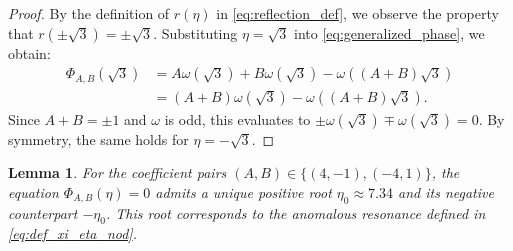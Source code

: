 \documentclass[reqno,english,11pt]{amsart}
\newtheorem{lemma}[theorem]{Lemma}
\theoremstyle{definition}
\numberwithin{equation}{section}
\begin{document}
\begin{proof}
    By the definition of $r(\eta)$ in \eqref{eq:reflection_def}, we observe the property that $r(\pm \sqrt{3}) = \pm \sqrt{3}$. Substituting $\eta = \sqrt{3}$ into \eqref{eq:generalized_phase}, we obtain:
    \begin{align*}
        \Phi_{A,B}(\sqrt{3}) &= A\omega(\sqrt{3}) + B\omega(\sqrt{3}) - \omega((A+B)\sqrt{3}) \\
        &= (A+B)\omega(\sqrt{3}) - \omega((A+B)\sqrt{3}).
    \end{align*}
    Since $A+B = \pm 1$ and $\omega$ is odd, this evaluates to $\pm \omega(\sqrt{3}) \mp \omega(\sqrt{3}) = 0$. By symmetry, the same holds for $\eta = -\sqrt{3}$.
\end{proof}
\begin{lemma}\label{lem:anomalous_res}
    For the coefficient pairs $(A,B) \in \{(4,-1), (-4,1)\}$, the equation $\Phi_{A,B}(\eta) = 0$ admits a unique positive root $\eta_0 \approx 7.34$ and its negative counterpart $-\eta_0$. This root corresponds to the anomalous resonance defined in \eqref{eq:def_xi_eta_nod}.
\end{lemma}
\end{document}
